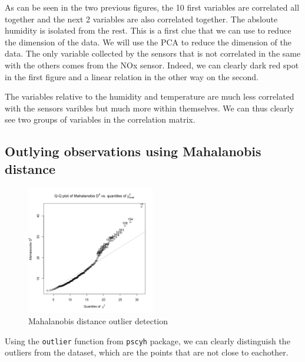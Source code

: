 As can be seen in the two previous figures, the 10 first variables are correlated all together and the next 2 variables are also correlated together. The absloute humidity is isolated from the rest. This is a first clue that we can use to reduce the dimension of the data. We will use the PCA to reduce the dimension of the data.
The only variable collected by the sensors that is not correlated in the same with the others comes from the NOx sensor. Indeed, we can clearly dark red spot in the first figure and a linear relation in the other way on the second.

The variables relative to the humidity and temperature are much less correlated with the sensors varibles but much more within themselves. We can thus clearly see two groups of variables in the correlation matrix.

\subsection{Outlying observations using Mahalanobis distance}
\begin{figure}[H]
  \centering
  \includegraphics[width=0.5\textwidth]{figs/outliers.png}
  \caption{Mahalanobis distance outlier detection}
  \label{fig:mahalanobis}
\end{figure}

Using the \verb|outlier| function from \verb|pscyh| package, we can clearly distinguish the outliers from the dataset, which are the points that are not close to eachother.